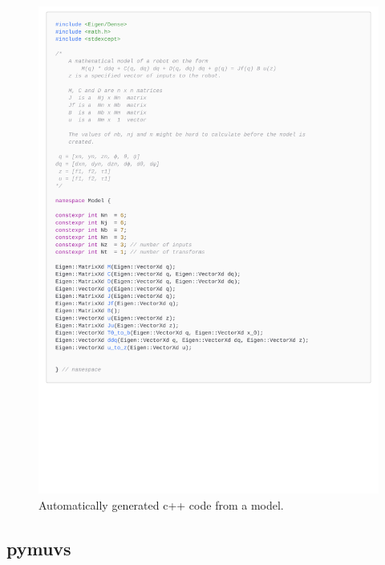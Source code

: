 \begin{figure}[h]
    \centering
    \includegraphics[page=1,width=\linewidth,trim=0 9cm 0 0]{assets/codegen.pdf}
    \caption{Automatically generated c++ code from a model.}
    \label{fig:codegen}
\end{figure}

\fi

\subsection{pymuvs}

